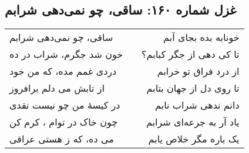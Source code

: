 \begin{center}
\section*{غزل شماره ۱۶۰: ساقی، چو نمی‌دهی شرابم}
\label{sec:160}
\begin{longtable}{l p{0.5cm} r}
ساقی، چو نمی‌دهی شرابم
&&
خونابه بده بجای آبم
\\
خون شد جگرم، شراب در ده
&&
تا کی دهی از جگر کبابم؟
\\
دردی غمم مده، که من خود
&&
از درد فراق تو خرابم
\\
از تابش می دلم برافروز
&&
تا روی دل از جهان بتابم
\\
در کیسهٔ من چو نیست نقدی
&&
دانم ندهی شراب نابم
\\
چون خاک در توام ، کرم کن
&&
یاد آر به جرعه‌ای شرابم
\\
می ده، که ز هستی عراقی
&&
یک باره مگر خلاص یابم
\\
\end{longtable}
\end{center}
